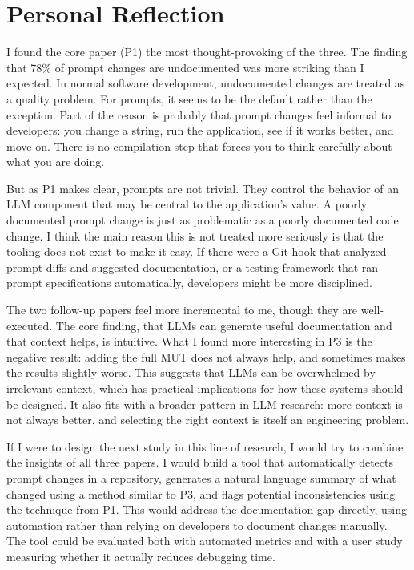 \documentclass[
    pdftex,
    final,
    11pt,
    a4paper,
    parskip=false,
    oneside,
    footheight=0mm,
    footinclude=false,
    toc=bibliography
]{scrbook}
\begin{document}
\section{Personal Reflection}

I found the core paper (P1) the most thought-provoking of the three. The finding that 78\% of prompt changes are undocumented was more striking than I expected. In normal software development, undocumented changes are treated as a quality problem. For prompts, it seems to be the default rather than the exception. Part of the reason is probably that prompt changes feel informal to developers: you change a string, run the application, see if it works better, and move on. There is no compilation step that forces you to think carefully about what you are doing.

But as P1 makes clear, prompts are not trivial. They control the behavior of an LLM component that may be central to the application's value. A poorly documented prompt change is just as problematic as a poorly documented code change. I think the main reason this is not treated more seriously is that the tooling does not exist to make it easy. If there were a Git hook that analyzed prompt diffs and suggested documentation, or a testing framework that ran prompt specifications automatically, developers might be more disciplined.

The two follow-up papers feel more incremental to me, though they are well-executed. The core finding, that LLMs can generate useful documentation and that context helps, is intuitive. What I found more interesting in P3 is the negative result: adding the full MUT does not always help, and sometimes makes the results slightly worse. This suggests that LLMs can be overwhelmed by irrelevant context, which has practical implications for how these systems should be designed. It also fits with a broader pattern in LLM research: more context is not always better, and selecting the right context is itself an engineering problem.

If I were to design the next study in this line of research, I would try to combine the insights of all three papers. I would build a tool that automatically detects prompt changes in a repository, generates a natural language summary of what changed using a method similar to P3, and flags potential inconsistencies using the technique from P1. This would address the documentation gap directly, using automation rather than relying on developers to document changes manually. The tool could be evaluated both with automated metrics and with a user study measuring whether it actually reduces debugging time.
\end{document}
